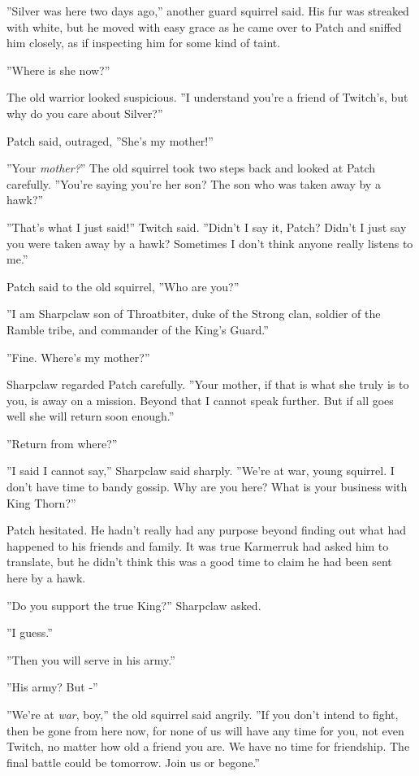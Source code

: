 \documentclass[12pt]{book}
\begin{document}
''Silver was here two days ago,'' another guard squirrel said. His fur was streaked with white, but he moved with easy grace as he came over to Patch and sniffed him closely, as if inspecting him for some kind of taint.

''Where is she now?''

The old warrior looked suspicious. ''I understand you're a friend of Twitch's, but why do you care about Silver?''

Patch said, outraged, ''She's my mother!''

''Your {\it mother?}'' The old squirrel took two steps back and looked at Patch carefully. ''You're saying you're her son? The son who was taken away by a hawk?''

''That's what I just said!'' Twitch said. ''Didn't I say it, Patch? Didn't I just say you were taken away by a hawk? Sometimes I don't think anyone really listens to me.''

Patch said to the old squirrel, ''Who are you?''

''I am Sharpclaw son of Throatbiter, duke of the Strong clan, soldier of the Ramble tribe, and commander of the King's Guard.''

''Fine. Where's my mother?''

Sharpclaw regarded Patch carefully. ''Your mother, if that is what she truly is to you, is away on a mission. Beyond that I cannot speak further. But if all goes well she will return soon enough.''

''Return from where?''

''I said I cannot say,'' Sharpclaw said sharply. ''We're at war, young squirrel. I don't have time to bandy gossip. Why are you here? What is your business with King Thorn?''

Patch hesitated. He hadn't really had any purpose beyond finding out what had happened to his friends and family. It was true Karmerruk had asked him to translate, but he didn't think this was a good time to claim he had been sent here by a hawk.

''Do you support the true King?'' Sharpclaw asked.

''I guess.''

''Then you will serve in his army.''

''His army? But -''

''We're at {\it war}, boy,'' the old squirrel said angrily. ''If you don't intend to fight, then be gone from here now, for none of us will have any time for you, not even Twitch, no matter how old a friend you are. We have no time for friendship. The final battle could be tomorrow. Join us or begone.''
\end{document}
